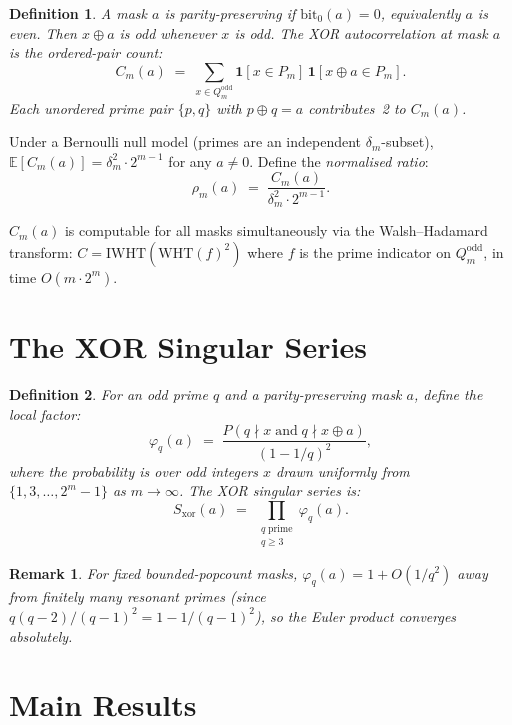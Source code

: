 \documentclass[11pt]{article}
\newtheorem{definition}{Definition}
\newtheorem{remark}{Remark}
\begin{document}
\begin{definition}
A mask $a$ is \emph{parity-preserving} if $\mathrm{bit}_0(a) = 0$,
equivalently $a$ is even.
Then $x \oplus a$ is odd whenever $x$ is odd.
The \emph{XOR autocorrelation} at mask $a$ is the ordered-pair count:
\[
  C_m(a)
  \;=\;
  \sum_{x \in Q_m^{\mathrm{odd}}} \mathbf{1}[x \in P_m]\,\mathbf{1}[x \oplus a \in P_m].
\]
Each unordered prime pair $\{p,q\}$ with $p \oplus q = a$ contributes~2
to $C_m(a)$.
\end{definition}

Under a Bernoulli null model (primes are an independent $\delta_m$-subset),
$\mathbb{E}[C_m(a)] = \delta_m^2 \cdot 2^{m-1}$ for any $a \neq 0$.
Define the \emph{normalised ratio}:
\[
  \rho_m(a) \;=\; \frac{C_m(a)}{\delta_m^2 \cdot 2^{m-1}}.
\]

$C_m(a)$ is computable for all masks simultaneously via the
Walsh--Hadamard transform:
$C = \mathrm{IWHT}(\mathrm{WHT}(f)^2)$ where $f$ is the prime indicator
on $Q_m^{\mathrm{odd}}$, in time $O(m \cdot 2^m)$.

\section{The XOR Singular Series}

\begin{definition}
For an odd prime $q$ and a parity-preserving mask $a$, define the
\emph{local factor}:
\[
  \varphi_q(a)
  \;=\;
  \frac{P(q \nmid x \;\text{and}\; q \nmid x \oplus a)}{(1 - 1/q)^2},
\]
where the probability is over odd integers $x$ drawn uniformly
from $\{1, 3, \ldots, 2^m - 1\}$ as $m \to \infty$.
The \emph{XOR singular series} is:
\[
  S_{\mathrm{xor}}(a)
  \;=\;
  \prod_{\substack{q \;\text{prime} \\ q \geq 3}} \varphi_q(a).
\]
\end{definition}

\begin{remark}
For fixed bounded-popcount masks, $\varphi_q(a) = 1 + O(1/q^2)$
away from finitely many resonant primes (since $q(q-2)/(q-1)^2 = 1 - 1/(q-1)^2$),
so the Euler product converges absolutely.
\end{remark}

\section{Main Results}
\end{document}
